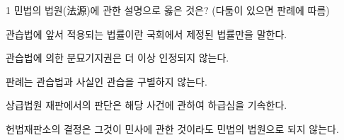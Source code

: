 \begin{question}{1}
민법의 법원(法源)에 관한 설명으로 옳은 것은? (다툼이 있으면 판례에 따름)
\begin{choices}
  \item 관습법에 앞서 적용되는 법률이란 국회에서 제정된 법률만을 말한다.
  \item 관습법에 의한 분묘기지권은 더 이상 인정되지 않는다.
  \item 판례는 관습법과 사실인 관습을 구별하지 않는다.
  \item 상급법원 재판에서의 판단은 해당 사건에 관하여 하급심을 기속한다.
  \item 헌법재판소의 결정은 그것이 민사에 관한 것이라도 민법의 법원으로 되지 않는다.
\end{choices}
\end{question}
